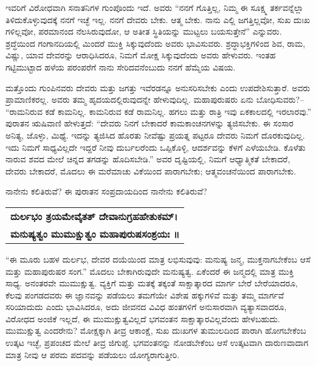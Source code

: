 ಇವರಿಗೆ ವಿರೋಧವಾಗಿ ಸನಾತನಿಗಳ ಗುಂಪೊಂದು ಇದೆ. ಅವರು “ನನಗೆ ಗೊತ್ತಿಲ್ಲ, ನಿಮ್ಮ ಈ ಸೂಕ್ಷ್ಮ ತರ್ಕವನ್ನೆಲ್ಲಾ ತಿಳಿದುಕೊಳ್ಳುವುದಕ್ಕೆ ನನಗೆ ಇಚ್ಛೆ ಇಲ್ಲ. ನನಗೆ ದೇವರು ಬೇಕು. ಆತ್ಮ ಬೇಕು. ನಾನು ಎಲ್ಲಿ ಜಗತ್ತಿಲ್ಲವೋ, ಸುಖ ದುಃಖ ಗಳಿಲ್ಲವೋ, ಪರಮಾನಂದ ನೆಲಸಿರುವುದೋ, ಆ ಅತೀತ ಸ್ಥಿತಿಯನ್ನು ಮುಟ್ಟಲು ಬಯಸುತ್ತೇನೆ” ಎನ್ನುವರು. ಶ್ರದ್ಧೆಯಿಂದ ಗಂಗಾನದಿಯಲ್ಲಿ ಮಿಂದರೆ ಮುಕ್ತಿ ಸಿಕ್ಕುವುದೆಂದು ಅವರು ಭಾವಿಸುವರು. ಶ್ರದ್ಧಾಭಕ್ತಿಗಳಿಂದ ಶಿವ, ರಾಮ, ವಿಷ್ಣು, ಯಾವ ದೇವರನ್ನು ಆರಾಧಿಸಿದರೂ, ನಿಮಗೆ ಮೋಕ್ಷ ಸಿಕ್ಕುವುದೆಂದು ಅವರು ಹೇಳುವರು. ಇಂತಹ ಗಟ್ಟಿಮುಟ್ಟಾದ ಹಳೆಯ ಪರಂಪರೆಗೆ ನಾನು ಸೇರಿದವನೆಂಬುದು ನನಗೆ ಹೆಮ್ಮೆಯ ವಿಷಯ. 

ಮತ್ತೊಂದು ಗುಂಪಿನವರು ದೇವರು ಮತ್ತು ಜಗತ್ತು ಇವೆರಡನ್ನೂ ಅನುಸರಿಸಬೇಕು ಎಂದು ಉಪದೇಶಿಸುತ್ತಾರೆ. ಅವರು ಪ್ರಾಮಾಣಿಕರಲ್ಲ. ಅವರು ತಮ್ಮ ಹೃದಯದಲ್ಲಿರುವುದನ್ನೇ ಹೇಳುವುದಿಲ್ಲ. ಮಹಾಪುರುಷರು ಏನು ಬೋಧಿಸು\-ವರು?– “ರಾಮನಿರುವ ಕಡೆ ಕಾಮನಿಲ್ಲ. ಕಾಮನಿರುವ ಕಡೆ ರಾಮನಿಲ್ಲ. ಹಗಲು ಮತ್ತು ರಾತ್ರಿ ಇವು ಏಕಕಾಲದಲ್ಲಿ ಇರಲಾರವು.” ಪುರಾತನ ಋಷಿವಾಣಿ ಹೇಳುತ್ತದೆ: “ದೇವರು ನಿನಗೆ ಬೇಕಾದರೆ ಕಾಮಕಾಂಚನಗಳನ್ನು ತ್ಯಜಿಸಬೇಕು. ಈ ಸಂಸಾರ ಅನಿತ್ಯ, ಜೊಳ್ಳು, ಮಿಥ್ಯೆ. ಇದನ್ನು ತ್ಯಜಿಸಿದ ಹೊರತು ನೀವೆಷ್ಟು ಪ್ರಯತ್ನ ಪಟ್ಟರೂ ದೇವರು ನಿಮಗೆ ದೊರಕುವುದಿಲ್ಲ. ಇದು ನಿಮಗೆ ಸಾಧ್ಯವಿಲ್ಲದೇ ಇದ್ದರೆ ನೀವು ದುರ್ಬಲರೆಂದು ಒಪ್ಪಿಕೊಳ್ಳಿ, ಆದರ್ಶವನ್ನು ಕೆಳಗೆ ಎಳೆಯಬೇಡಿ. ಕೊಳೆತು ನಾರುವ ಶವದ ಮೇಲೆ ಚಿನ್ನದ ತಗಡನ್ನು ಹೊದಿಸಬೇಡಿ.” ಅವರ ದೃಷ್ಟಿಯಲ್ಲಿ, ನಿಮಗೆ ಆಧ್ಯಾತ್ಮಿಕತೆ ಬೇಕಾದರೆ, ದೇವರು ಬೇಕಾದರೆ, ಮೊದಲು ಈ ಮರೆಮಾಚು ವಿಕೆಯಿಂದ ಪಾರಾಗಬೇಕು; ಆತ್ಮವಂಚನೆಯಿಂದ ಪಾರಾಗಬೇಕು. 

ನಾನೇನು ಕಲಿತಿರುವೆ? ಈ ಪುರಾತನ ಸಂಪ್ರದಾಯದಿಂದ ನಾನೇನು ಕಲಿತಿರುವೆ?

\begin{longtable}{@{}l@{}}
\textbf{ದುರ್ಲಭಂ ತ್ರಯಮೇವೈತತ್​ ದೇವಾನುಗ್ರಹಹೇತುಕಮ್​ ।} \\
\textbf{ಮನುಷ್ಯತ್ವಂ ಮುಮುಕ್ಷುತ್ವಂ ಮಹಾಪುರುಷಸಂಶ್ರಯಃ ॥} \\
\end{longtable}

“ಈ ಮೂರು ಬಹಳ ದುರ್ಲಭ, ದೇವರ ದಯೆಯಿಂದ ಮಾತ್ರ ಲಭಿಸುವುವು: ಮನುಷ್ಯ ಜನ್ಮ, ಮುಕ್ತನಾಗಬೇಕೆಂಬ ಆಸೆ ಮತ್ತು ಮಹಾಪುರುಷರ ಸಂಗ.” ಮೊದಲು ಬೇಕಾಗಿರುವುದೇ ಮನುಷ್ಯತ್ವ. ಏಕೆಂದರೆ ಈ ಜನ್ಮದಲ್ಲಿ ಮಾತ್ರ ಮುಕ್ತಿ ಸಾಧ್ಯ. ಅನಂತರವೇ ಮುಮುಕ್ಷುತ್ವ. ವ್ಯಕ್ತಿಗೆ ಮತ್ತು ಮತಕ್ಕೆ ತಕ್ಕಂತೆ ಸಾಕ್ಷಾತ್ಕಾರದ ಮಾರ್ಗ ಬೇರೆ ಬೇರೆಯಾದರೂ, ಕೆಲವು ಪಂಗಡದವರು ಈ ಜ್ಞಾನವನ್ನು ಪಡೆಯಲು ತಮಗೆಯೇ ವಿಶೇಷ ಹಕ್ಕುಗಳಿವೆ ಮತ್ತು ತಮ್ಮ ಮಾರ್ಗವೆ ಸರಿಯಾದುದು ಎಂದು ಭಾವಿಸಿದರೂ, ಅದು ಜೀವನದ ವಿವಿಧ ಹಂತಗಳಿಗೆ ಅನುಸಾರವಾಗಿ ವ್ಯತ್ಯಾಸವಾದರೂ, ವಿರೋಧದ ಅಂಜಿಕೆ ಇಲ್ಲದೆ, ಈ ಮುಮುಕ್ಷುತ್ವವಿಲ್ಲದೆ ಭಗವಂತನ ಸಾಕ್ಷಾತ್ಕಾರವಿಲ್ಲವೆಂದು ಹೇಳಬಹುದು. ಮುಮುಕ್ಷುತ್ವ ಎಂದರೇನು? ಮೋಕ್ಷಕ್ಕಾಗಿ ತೀವ್ರ ಆಕಾಂಕ್ಷೆ, ಸುಖ ದುಃಖಗಳ ತುಮುಲದಿಂದ ಪಾರಾಗಿ ಹೋಗಬೇಕೆಂಬ ಉತ್ಕಟ ಇಚ್ಛೆ, ಪ್ರಪಂಚದ ಮೇಲೆ ತೀವ್ರ ಜಿಗುಪ್ಸೆ. ಭಗವಂತನನ್ನು ನೋಡಬೇಕೆಂಬ ಆಸೆ ಉತ್ಕಟವಾಗಿ ದಾರುಣವಾದಾಗ ಮಾತ್ರ ನೀವು ಆ ಪರಮ ಪದವನ್ನು ಪಡೆಯಲು ಯೋಗ್ಯರಾಗುತ್ತೀರಿ. 

